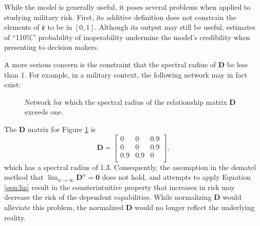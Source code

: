 \documentclass{article}
\begin{document}
While the \citeauthor{haimes-iiom} model is generally useful, it poses several problems when applied to studying military risk. First, its additive definition does not constrain the elements of $\hat{\mathbf{r}}$ to be in $[0,1]$. Although its output may still be useful, estimates of ``110\%'' probability of inoperability undermine the model's credibility when presenting to decision makers. 

A more serious concern is the constraint that the spectral radius of $\mathbf{D}$ be less than 1. For example, in a military context, the following network may in fact exist:

\begin{figure}[!htb]
\centering
{}
\label{fig:ovary}
\caption{Network for which the spectral radius of the relationship matrix $\mathbf{D}$ exceeds one.}
\end{figure}
The $\mathbf{D}$ matrix for Figure \ref{fig:ovary} is 
\begin{equation*}
\mathbf{D} = 
\begin{bmatrix}
0 & 0 & 0.9 \\
0 & 0 & 0.9 \\
0.9 & 0.9 & 0\\
\end{bmatrix},
\end{equation*}
which has a spectral radius of 1.3. Consequently, the assumption in the \ac{dematel} method that $\lim_{n\rightarrow \infty} \mathbf{D}^n = \mathbf{0}$ does not hold, and attempts to apply Equation \ref{eqn:lin} result in the counterintuitive property that increases in risk may decrease the risk of the dependent capabilities. While normalizing $\mathbf{D}$ would alleviate this problem, the normalized $\mathbf{D}$ would no longer reflect the underlying reality. 
\end{document}
